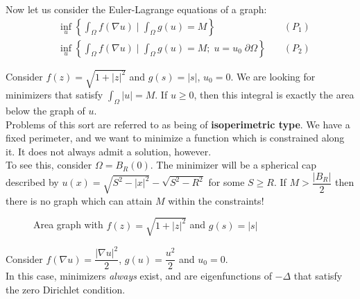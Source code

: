 \documentclass{memoir}
\begin{document}


Now let us consider the Euler-Lagrange equations of a graph:
\begin{align*}
	&\inf_{u} \left\{ \int_\Omega f(\nabla u) \mid \int_\Omega g(u) = M \right\} \quad &(P_1)\\
	&\inf_{u} \left\{ \int_\Omega f(\nabla u) \mid \int_{\Omega }g(u) = M; \; u = u_0 \; \partial \Omega  \right\}  \quad &(P_2)
\end{align*}

\begin{exmp}
	Consider \(f(z) = \sqrt{1+\left| z \right|^2} \) and \(g(s) = \left| s \right| \), \(u_0 = 0\). We are looking for minimizers that satisfy \(\int_\Omega \left| u \right| = M\). If \(u\geq 0\), then this integral is exactly the area below the graph of \(u\).\\

	Problems of this sort are referred to as being of \textbf{isoperimetric type}. We have a fixed perimeter, and we want to minimize a function which is constrained along it. It does not always admit a solution, however.\\

	To see this, consider \(\Omega = B_R(0)\). The minimizer will be a spherical cap described by \(u(x) = \sqrt{S^2-\left| x \right|^2} - \sqrt{S^2 - R^2} \) for some \(S\geq R\). If \(M > \dfrac{\left| B_R \right| }{2}\) then there is no graph which can attain \(M\) within the constraints!
\end{exmp}
\begin{figure}[ht]
    \centering
     \def\svgwidth{1\linewidth}
     
     \caption{Area graph with \(f(z) = \sqrt{1+\left| z \right|^2} \) and \(g(s) = \left| s \right| \)}
    \label{fig:example-space}
\end{figure}

\begin{exmp}
	Consider \(f(\nabla u) = \dfrac{\left| \nabla u \right|^2}{2}\), \(g(u) = \dfrac{u^2}{2}\) and \(u_0 = 0\).\\

	In this case, minimizers \textit{always} exist, and are eigenfunctions of \(-\Delta \) that satisfy the zero Dirichlet condition.
\end{exmp}
\end{document}
